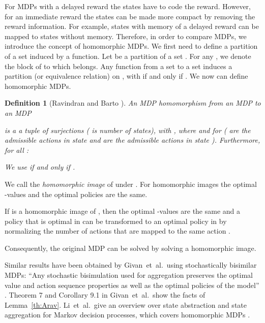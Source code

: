 \documentclass{article}
\newtheorem{definitionA}{Definition}
\begin{document}
\begin{appendices}
For MDPs with a delayed reward the
states have to code the reward. 
However, for an immediate reward the
states can be made more compact by removing the reward information.
For example, states with memory of a delayed reward can be mapped
to states without memory.
Therefore, in order to compare MDPs, we introduce the concept of homomorphic MDPs.
We first need to define a partition of a set induced by a function.
Let  be a partition of a set . For any ,
we denote  the block of  to which  belongs. 
Any function  from a set  to a set  
induces a partition (or equivalence relation) on , 
with  if and only if .
We now can define homomorphic MDPs.
\begin{definitionA}[Ravindran and Barto \cite{Ravindran:01,Ravindran:03}]
An MDP homomorphism  from
an MDP 
to an MDP

is a a tuple of surjections  ( is number of
states), with ,
where  and  for  ( are the admissible actions in state 
and  are the admissible actions in state ).
Furthermore, for all :

We use  if and only if .
\end{definitionA}

We call
 the {\em homomorphic image} of  under .
For homomorphic images the optimal -values and the optimal 
policies are the same. 
\begin{lemmaA}
\label{th:Arav}
If  is a homomorphic image of , then
the optimal -values are the same and
a policy that is optimal in  can be transformed to
an optimal policy in  by normalizing the number of actions 
that are mapped to the same action .
\end{lemmaA}
Consequently, the original MDP
can be solved by solving a homomorphic image.

Similar results have been obtained by
Givan~et~al.\ using stochastically bisimilar MDPs:
``Any stochastic bisimulation used for aggregation preserves the
optimal value and action sequence properties as well as the optimal
policies of the model'' \cite{Givan:03}.
Theorem 7 and Corollary 9.1 in Givan~et~al.\ show the facts of
Lemma~\ref{th:Arav}. 
Li~et~al.\ give an overview over state abstraction and state aggregation for
Markov decision processes, which covers homomorphic MDPs \cite{Li:06}.



\end{appendices}
\end{document}
